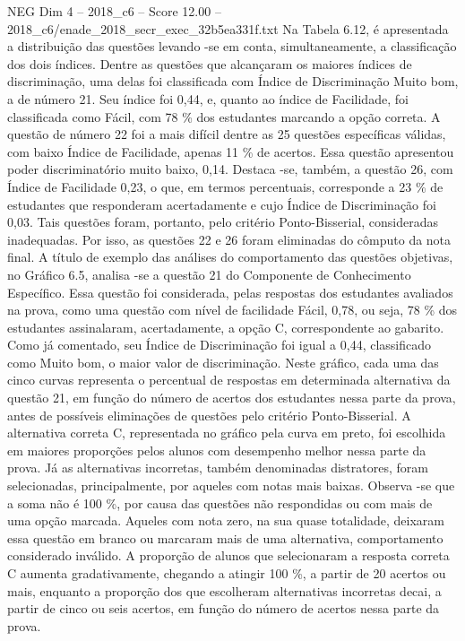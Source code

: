 \begin{textsample}{NEG Dim 4 – 2018\_c6 – Score 12.00 – 2018\_c6/enade\_2018\_secr\_exec\_32b5ea331f.txt}
Na Tabela 6.12, é apresentada a distribuição das questões levando -se em conta, simultaneamente, a classificação dos dois índices.
Dentre as questões que alcançaram os maiores índices de discriminação, uma delas foi classificada com Índice de Discriminação Muito bom, a de número 21.
Seu índice foi 0,44, e, quanto ao índice de Facilidade, foi classificada como Fácil, com 78 \% dos estudantes marcando a opção correta.
A questão de número 22 foi a mais difícil dentre as 25 questões específicas válidas, com baixo Índice de Facilidade, apenas 11 \% de acertos.
Essa questão apresentou poder discriminatório muito baixo, 0,14.
Destaca -se, também, a questão 26, com Índice de Facilidade 0,23, o que, em termos percentuais, corresponde a 23 \% de estudantes que responderam acertadamente e cujo Índice de Discriminação foi 0,03.
Tais questões foram, portanto, pelo critério Ponto-Bisserial, consideradas inadequadas.
Por isso, as questões 22 e 26 foram eliminadas do cômputo da nota final.
A título de exemplo das análises do comportamento das questões objetivas, no Gráfico 6.5, analisa -se a questão 21 do Componente de Conhecimento Específico.
Essa questão foi considerada, pelas respostas dos estudantes avaliados na prova, como uma questão com nível de facilidade Fácil, 0,78, ou seja, 78 \% dos estudantes assinalaram, acertadamente, a opção C, correspondente ao gabarito.
Como já comentado, seu Índice de Discriminação foi igual a 0,44, classificado como Muito bom, o maior valor de discriminação.
Neste gráfico, cada uma das cinco curvas representa o percentual de respostas em determinada alternativa da questão 21, em função do número de acertos dos estudantes nessa parte da prova, antes de possíveis eliminações de questões pelo critério Ponto-Bisserial.
A alternativa correta C, representada no gráfico pela curva em preto, foi escolhida em maiores proporções pelos alunos com desempenho melhor nessa parte da prova.
Já as alternativas incorretas, também denominadas distratores, foram selecionadas, principalmente, por aqueles com notas mais baixas.
Observa -se que a soma não é 100 \%, por causa das questões não respondidas ou com mais de uma opção marcada.
Aqueles com nota zero, na sua quase totalidade, deixaram essa questão em branco ou marcaram mais de uma alternativa, comportamento considerado inválido.
A proporção de alunos que selecionaram a resposta correta C aumenta gradativamente, chegando a atingir 100 \%, a partir de 20 acertos ou mais, enquanto a proporção dos que escolheram alternativas incorretas decai, a partir de cinco ou seis acertos, em função do número de acertos nessa parte da prova.

\end{textsample}
